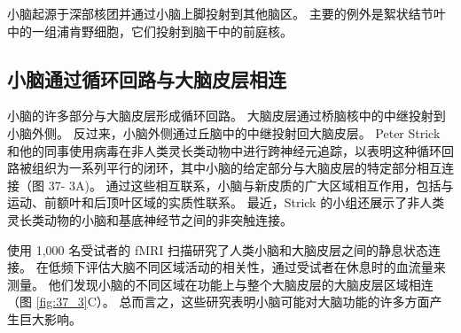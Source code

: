 小脑起源于深部核团并通过小脑上脚投射到其他脑区。
主要的例外是絮状结节叶中的一组浦肯野细胞，它们投射到脑干中的前庭核。


\subsection{小脑通过循环回路与大脑皮层相连}

小脑的许多部分与大脑皮层形成循环回路。
大脑皮层通过桥脑核中的中继投射到小脑外侧。
反过来，小脑外侧通过丘脑中的中继投射回大脑皮层。
Peter Strick 和他的同事使用病毒在非人类灵长类动物中进行跨神经元追踪，以表明这种循环回路被组织为一系列平行的闭环，其中小脑的给定部分与大脑皮层的特定部分相互连接（图 37- 3A)。
通过这些相互联系，小脑与新皮质的广大区域相互作用，包括与运动、前额叶和后顶叶区域的实质性联系。
最近，Strick 的小组还展示了非人类灵长类动物的小脑和基底神经节之间的非突触连接。


使用 1,000 名受试者的 fMRI 扫描研究了人类小脑和大脑皮层之间的静息状态连接。
在低频下评估大脑不同区域活动的相关性，通过受试者在休息时的血流量来测量。
他们发现小脑的不同区域在功能上与整个大脑皮层的大脑皮层区域相连（图 \ref{fig:37_3}C）。
总而言之，这些研究表明小脑可能对大脑功能的许多方面产生巨大影响。


